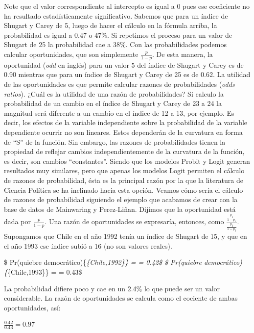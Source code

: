 \documentclass[]{book}
\begin{document}
Note que el valor correspondiente al intercepto es igual a 0 pues ese
coeficiente no ha resultado estadísticamente significativo. Sabemos que
para un índice de Shugart y Carey de 5, luego de hacer el cálculo en la
fórmula arriba, la probabilidad es igual a 0.47 o 47\%. Si repetimos el
proceso para un valor de Shugart de 25 la probabilidad cae a 38\%. Con
las probabilidades podemos calcular oportunidades, que son simplemente
\(\frac {p}{1-p}\). De esta manera, la oportunidad (\emph{odd} en
inglés) para un valor 5 del índice de Shugart y Carey es de 0.90
mientras que para un índice de Shugart y Carey de 25 es de 0.62. La
utilidad de las oportunidades es que permite calcular razones de
probabilidades (\emph{odds ratios}). ¿Cuál es la utilidad de una razón
de probabilidades? Si calculo la probabilidad de un cambio en el índice
de Shugart y Carey de 23 a 24 la magnitud será diferente a un cambio en
el índice de 12 a 13, por ejemplo. Es decir, los efectos de la variable
independiente sobre la probabilidad de la variable dependiente ocurrir
no son lineares. Estos dependerán de la curvatura en forma de ``S'' de
la función. Sin embargo, las razones de probabilidades tienen la
propiedad de reflejar cambios independientemente de la curvatura de la
función, es decir, son cambios ``constantes''. Siendo que los modelos
Probit y Logit generan resultados muy similares, pero que apenas los
modelos Logit permiten el cálculo de razones de probabilidad, ésta es la
principal razón por la que la literatura de Ciencia Política se ha
inclinado hacia esta opción. Veamos cómo sería el cálculo de razones de
probabilidad siguiendo el ejemplo que acabamos de crear con la base de
datos de Mainwaring y Perez-Liñan. Dijimos que la oportunidad está dada
por \(\frac {p}{1 - p}\). Una razón de oportunidades se expresaría,
entonces, como \(\frac {\frac {p_1}{1-p_1}}{\frac {p_2}{1-p_2}}\).
Supongamos que Chile en el año 1992 tenía un índice de Shugart de 15, y
que en el año 1993 ese índice subió a 16 (no son valores reales).

\$ Pr(quiebre democrático)\{\emph{\{Chile,1992\}\} =
 = 0.42\$ \$
Pr(quiebre democrático)\{}\{Chile,1993\}\} =
 = 0.43\$

La probabilidad difiere poco y cae en un 2.4\% lo que puede ser un valor
considerable. La razón de oportunidades se calcula como el cociente de
ambas oportunidades, así:

\(\frac {0.42}{0.43}=0.97\)
\end{document}
